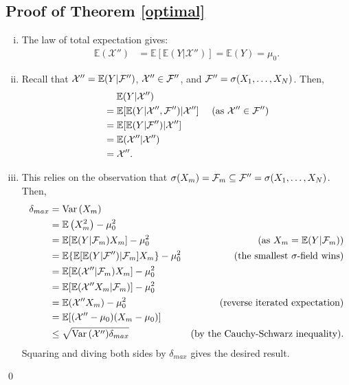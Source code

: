 \documentclass[12pt]{article}
\newcommand{\E}{\mathbb{E}}
\theoremstyle{definition}
\theoremstyle{definition}
\def\F{{\cal F}}
\def\E{{\mathbb E}}
\def\Var{{\rm Var}\,}
\begin{document}
\subsection{Proof of Theorem \ref{optimal}}
\begin{enumerate}[i)]
\item The law of total expectation gives:
\begin{align*}
\E(\mathcal{X}'') &= \E[\E(Y|\mathcal{X}'')] =  \E(Y) = \mu_0.
\end{align*}

\item Recall that $ \mathcal{X}'' = \E(Y | \F'')$, $\mathcal{X}'' \in \F''$, and $\F'' = \sigma(X_1, \dots, X_N)$. Then,
\begin{align*}
&\hspace{1.3em}  \E(Y | \mathcal{X}'') \\
 &= \E[\E(Y|\mathcal{X}'',\F'')|\mathcal{X}''] & \text{ (as $\mathcal{X}'' \in \F''$)}\\
&= \E[\E(Y|\F'')|\mathcal{X}'']\\
&= \E(\mathcal{X}''|\mathcal{X}'') \\
&= \mathcal{X}''.
\end{align*}

\item This relies on the observation that $\sigma(X_m) = \F_m \subseteq \F'' = \sigma(X_1, \dots, X_N)$. Then,
\begin{align*}
\delta_{max} &=\Var(X_m)\\
 &= \E\left(X_m^2\right) - \mu_0^2\\
 &= \E[\E(Y|\F_m)X_m] - \mu_0^2 & \text{(as $X_m = \E(Y|\F_m)$)}\\
 &= \E\{\E[\E(Y|\F'')|\F_m]X_m\} - \mu_0^2 & \text{(the smallest $\sigma$-field wins)}\\
 &= \E[\E(\mathcal{X}''|\F_m)X_m] - \mu_0^2 \\
 &= \E[\E(\mathcal{X}''X_m|\F_m)] - \mu_0^2 \\
 &= \E(\mathcal{X}''X_m) - \mu_0^2 & \text{(reverse iterated expectation)} \\
 &= \E[(\mathcal{X}''-\mu_0)(X_m-\mu_0)]  \\
 &\leq \sqrt{\Var(\mathcal{X}'')\delta_{max} } & \text{(by the Cauchy-Schwarz inequality).} 
\end{align*}
Squaring and diving both sides by $\delta_{max} $ gives the desired result. 

\end{enumerate}
\qed
\end{document}

